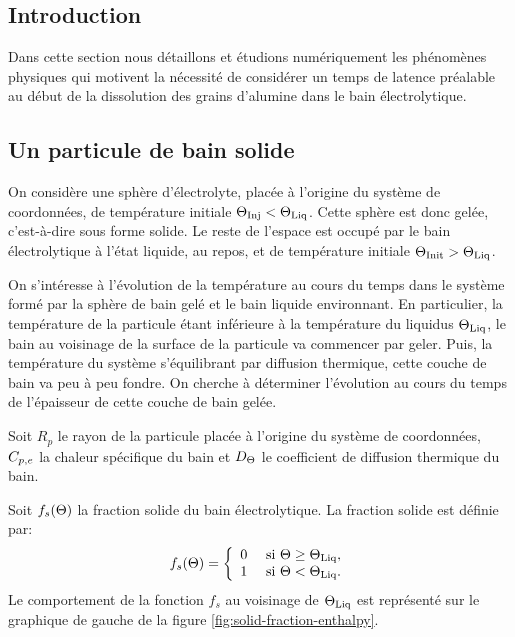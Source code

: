 \subsection*{Introduction}
Dans cette section nous détaillons et étudions numériquement les
phénomènes physiques qui motivent la nécessité de considérer un temps
de latence préalable au début de la dissolution des grains d'alumine
dans le bain électrolytique.


\subsection{Un particule de bain solide}
On considère une sphère d'électrolyte, placée à l'origine du système
de coordonnées, de température initiale $\Theta_\text{Inj}<\Theta_\text{Liq}$. Cette sphère
est donc gelée, c'est-à-dire sous forme solide. Le reste de l'espace
est occupé par le bain électrolytique à l'état liquide, au repos, et
de température initiale $\Theta_\text{Init} > \Theta_\text{Liq}$.

On s'intéresse à l'évolution de la température au cours du
temps dans le système formé par la sphère de bain gelé et le
bain liquide environnant. En particulier, la température de la
particule étant inférieure à la température du liquidus
$\Theta_\text{Liq}$, le bain au voisinage de la surface de la particule va
commencer par geler. Puis, la température du système s'équilibrant par
diffusion thermique, cette couche de bain va peu à peu fondre. On
cherche à déterminer l'évolution au cours du temps de l'épaisseur de
cette couche de bain gelée.

Soit $R_p$ le rayon de la particule placée à l'origine du
système de coordonnées, $C_{p,e}$ la chaleur spécifique du bain et
$D_\Theta$ le coefficient de diffusion thermique du bain.

Soit $f_s(\Theta)$ la fraction solide du bain électrolytique. La
fraction solide est définie par:
\begin{equation}
  f_s(\Theta) = \left\{
  \begin{array}{ll}
    0           & \text{ si } \Theta \geq \Theta_\text{Liq},\\
    1           & \text{ si } \Theta < \Theta_\text{Liq}.
  \end{array}
  \right.
\end{equation}
Le comportement de la fonction $f_s$ au voisinage de $\Theta_\text{Liq}$ est
représenté sur le graphique de gauche de la figure
\ref{fig:solid-fraction-enthalpy}.

